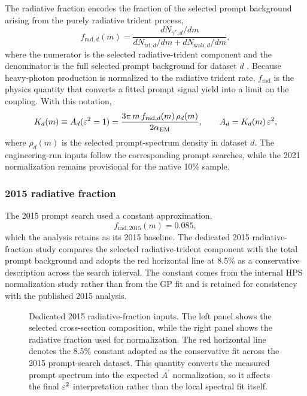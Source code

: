 The radiative fraction encodes the fraction of the selected prompt background arising
from the purely radiative trident process,
\begin{equation}
f_{\mathrm{rad},d}(m)
=
\frac{dN_{\gamma^\ast,d}/dm}{dN_{\mathrm{tri},d}/dm + dN_{\mathrm{wab},d}/dm},
\label{eq:frad-def}
\end{equation}
where the numerator is the selected radiative-trident component and the denominator is
the full selected prompt background for dataset $d$
\cite{HPS2015DarkPhoton,HPS2016PromptLong}. Because heavy-photon production is
normalized to the radiative trident rate, $f_{\mathrm{rad}}$ is the physics quantity
that converts a fitted prompt signal yield into a limit on the coupling. With this
notation,
\begin{equation}
K_d(m) \equiv A_d(\varepsilon^2 = 1)
= \frac{3\pi\,m\,f_{\mathrm{rad},d}(m)\,\rho_d(m)}{2\alpha_{\mathrm{EM}}},
\qquad
A_d = K_d(m)\,\varepsilon^2,
\label{eq:kd-radfrac}
\end{equation}
where $\rho_d(m)$ is the selected prompt-spectrum density in dataset $d$. The
engineering-run inputs follow the corresponding prompt searches, while the 2021
normalization remains provisional for the native 10\% sample.

\subsubsection{2015 radiative fraction}

The 2015 prompt search used a constant approximation,
\begin{equation}
f_{\mathrm{rad},2015}(m) = 0.085,
\end{equation}
which the analysis retains as its 2015 baseline. The dedicated 2015
radiative-fraction study compares the selected radiative-trident component with the
total prompt background and adopts the red horizontal line at 8.5\% as a conservative
description across the search interval. The constant comes from the internal HPS
normalization study rather than from the GP fit and is retained for consistency with
the published 2015 analysis.

\begin{figure}[H]
\centering
{}
\caption{Dedicated 2015 radiative-fraction inputs. The left panel shows the selected
cross-section composition, while the right panel shows the radiative fraction used for
normalization. The red horizontal line denotes the 8.5\% constant adopted as the
conservative fit across the 2015 prompt-search dataset. This quantity converts the
measured prompt spectrum into the expected $A^\prime$ normalization, so it affects the
final $\varepsilon^2$ interpretation rather than the local spectral fit itself.}
\label{fig:2015-radfrac}
\end{figure}

